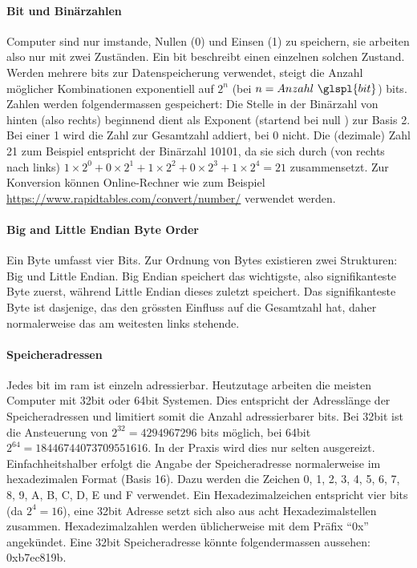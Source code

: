 \documentclass[11pt, a4paper]{article}
\begin{document}
\paragraph{Bit und Binärzahlen}
Computer sind nur imstande, Nullen (0) und Einsen (1) zu speichern, sie arbeiten also nur mit zwei Zuständen. Ein \gls{bit} beschreibt einen einzelnen solchen Zustand. Werden mehrere \glspl{bit} zur Datenspeicherung verwendet, steigt die Anzahl möglicher Kombinationen exponentiell auf \( 2^n \) (bei \(n = Anzahl~\glspl{bit}\)) \glspl{bit}. Zahlen werden folgendermassen gespeichert: Die Stelle in der Binärzahl von hinten (also rechts) beginnend dient als Exponent (startend bei null ) zur Basis 2. Bei einer 1 wird die Zahl zur Gesamtzahl addiert, bei 0 nicht. Die (dezimale) Zahl 21 zum Beispiel entspricht der Binärzahl 10101, da sie sich durch (von rechts nach links) \(1 \times 2^0 + 0 \times 2^1 + 1 \times 2^2 + 0 \times 2^3 + 1 \times 2^4 = 21\) zusammensetzt. Zur Konversion können Online-Rechner wie zum Beispiel \url{https://www.rapidtables.com/convert/number/} verwendet werden.

\paragraph{Big and Little Endian Byte Order}
Ein Byte umfasst vier Bits. Zur Ordnung von Bytes existieren zwei Strukturen: Big und Little Endian. Big Endian speichert das wichtigste, also signifikanteste Byte zuerst, während Little Endian dieses zuletzt speichert. Das signifikanteste Byte ist dasjenige, das den grössten Einfluss auf die Gesamtzahl hat, daher normalerweise das am weitesten links stehende.

\paragraph{Speicheradressen}
Jedes \gls{bit} im \gls{ram} ist einzeln adressierbar. Heutzutage arbeiten die meisten Computer mit 32bit oder 64bit Systemen. Dies entspricht der Adresslänge der Speicheradressen und limitiert somit die Anzahl adressierbarer \glspl{bit}. Bei 32bit ist die Ansteuerung von \(2^{32} = 4 294 967 296\) \glspl{bit} möglich, bei 64bit \(2^{64} = 18 446 744 073 709 551 616\). In der Praxis wird dies nur selten ausgereizt. Einfachheitshalber erfolgt die Angabe der Speicheradresse normalerweise im hexadezimalen Format (Basis 16). Dazu werden die Zeichen 0, 1, 2, 3, 4, 5, 6, 7, 8, 9, A, B, C, D, E und F verwendet. Ein Hexadezimalzeichen entspricht vier \glspl{bit} (da \(2^4 = 16\)), eine 32bit Adresse setzt sich also aus acht Hexadezimalstellen zusammen. Hexadezimalzahlen werden üblicherweise mit dem Präfix ``0x'' angekündet. Eine 32bit Speicheradresse könnte folgendermassen aussehen: 0xb7ec819b. \cite{BitWiki31:online}
\end{document}
